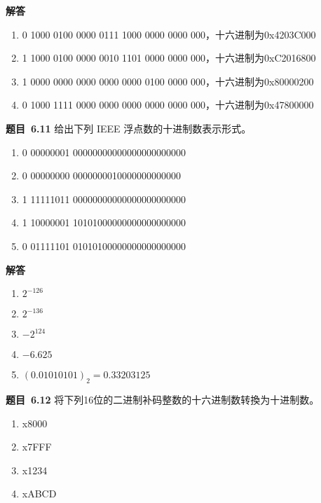 \documentclass[10pt,a4paper,UTF8]{ctexart}
\newcommand{\problemname}{待定义}
\newenvironment{problem}{\begin{shaded}\par\noindent\textbf{题目\  \problemname}}{\end{shaded}\par}
\newenvironment{solution}{\par\noindent\textbf{解答}\ }{\par}
\begin{document}
\begin{solution}
	\begin{enumerate}[(1)]
		\item 0 1000 0100 0000 0111 1000 0000 0000 000，十六进制为0x4203C000
		\item 1 1000 0100 0000 0010 1101 0000 0000 000，十六进制为0xC2016800
		\item 1 0000 0000 0000 0000 0000 0100 0000 000，十六进制为0x80000200
		\item 0 1000 1111 0000 0000 0000 0000 0000 000，十六进制为0x47800000
	\end{enumerate}
\end{solution}


\renewcommand{\problemname}{6.11}
\begin{problem}
	给出下列 IEEE 浮点数的十进制数表示形式。
	\begin{enumerate}[(1)]
		\item 0 00000001 00000000000000000000000
		\item 0 00000000 0000000010000000000000
		\item 1 11111011 00000000000000000000000
		\item 1 10000001 10101000000000000000000
		\item 0 01111101 01010100000000000000000
	\end{enumerate}
\end{problem}

\begin{solution}
	\begin{enumerate}[(1)]
		\item $2^{-126}$
		\item $2^{-136}$ 
		\item $-2^{124}$
		\item $-6.625$
		\item $(0.01010101)_2=0.33203125$​
	\end{enumerate}
\end{solution}


\renewcommand{\problemname}{6.12}
\begin{problem}
	将下列16位的二进制补码整数的十六进制数转換为十进制数。
	\begin{enumerate}[(1)]
		\item x8000
		\item x7FFF
		\item x1234
		\item xABCD
	\end{enumerate}
\end{problem}
\end{document}
